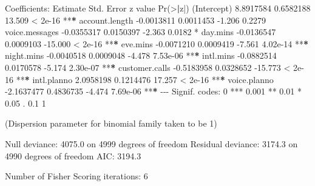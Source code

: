 \documentclass[
  11pt,
]{book}
\makeatletter
\newenvironment{Shaded}{}{}
\newcommand{\ControlFlowTok}[1]{\textcolor[rgb]{0.07,0.07,0.07}{#1}}
\newcommand{\DecValTok}[1]{#1}
\newcommand{\ErrorTok}[1]{\textcolor[rgb]{0.21,0.21,0.21}{\textbf{#1}}}
\newcommand{\FloatTok}[1]{#1}
\newcommand{\FunctionTok}[1]{#1}
\newcommand{\NormalTok}[1]{#1}
\newcommand{\SpecialCharTok}[1]{\textcolor[rgb]{0.39,0.39,0.39}{#1}}
\newcommand{\StringTok}[1]{\textcolor[rgb]{0.39,0.39,0.39}{#1}}
\newenvironment{kframe}{%
\medskip{}
\setlength{\fboxsep}{.8em}
 \def\at@end@of@kframe{}%
 \ifinner\ifhmode%
  \def\at@end@of@kframe{\end{minipage}}%
  \begin{minipage}{\columnwidth}%
 \fi\fi%
 \def\FrameCommand##1{\hskip\@totalleftmargin \hskip-\fboxsep
 \colorbox{shadecolor}{##1}\hskip-\fboxsep
     \hskip-\linewidth \hskip-\@totalleftmargin \hskip\columnwidth}%
 \MakeFramed {\advance\hsize-\width
   \@totalleftmargin\z@ \linewidth\hsize
   \@setminipage}}%
 {\par\unskip\endMakeFramed%
 \at@end@of@kframe}
\renewenvironment{Shaded}{\begin{kframe}}{\end{kframe}}
\theoremstyle{definition}
\theoremstyle{definition}
\theoremstyle{definition}
\theoremstyle{definition}
\theoremstyle{remark}
\makeatother
\begin{document}
\begin{Shaded}
\begin{Highlighting}[]
\NormalTok{   Coefficients}\SpecialCharTok{:}
\NormalTok{                    Estimate Std. Error z value }\FunctionTok{Pr}\NormalTok{(}\SpecialCharTok{\textgreater{}}\ErrorTok{|}\NormalTok{z}\SpecialCharTok{|}\NormalTok{)    }
\NormalTok{   (Intercept)     }\FloatTok{8.8917584}  \FloatTok{0.6582188}  \FloatTok{13.509}  \SpecialCharTok{\textless{}} \FloatTok{2e{-}16} \SpecialCharTok{**}\ErrorTok{*}
\NormalTok{   account.length }\SpecialCharTok{{-}}\FloatTok{0.0013811}  \FloatTok{0.0011453}  \SpecialCharTok{{-}}\FloatTok{1.206}   \FloatTok{0.2279}    
\NormalTok{   voice.messages }\SpecialCharTok{{-}}\FloatTok{0.0355317}  \FloatTok{0.0150397}  \SpecialCharTok{{-}}\FloatTok{2.363}   \FloatTok{0.0182} \SpecialCharTok{*}  
\NormalTok{   day.mins       }\SpecialCharTok{{-}}\FloatTok{0.0136547}  \FloatTok{0.0009103} \SpecialCharTok{{-}}\FloatTok{15.000}  \SpecialCharTok{\textless{}} \FloatTok{2e{-}16} \SpecialCharTok{**}\ErrorTok{*}
\NormalTok{   eve.mins       }\SpecialCharTok{{-}}\FloatTok{0.0071210}  \FloatTok{0.0009419}  \SpecialCharTok{{-}}\FloatTok{7.561} \FloatTok{4.02e{-}14} \SpecialCharTok{**}\ErrorTok{*}
\NormalTok{   night.mins     }\SpecialCharTok{{-}}\FloatTok{0.0040518}  \FloatTok{0.0009048}  \SpecialCharTok{{-}}\FloatTok{4.478} \FloatTok{7.53e{-}06} \SpecialCharTok{**}\ErrorTok{*}
\NormalTok{   intl.mins      }\SpecialCharTok{{-}}\FloatTok{0.0882514}  \FloatTok{0.0170578}  \SpecialCharTok{{-}}\FloatTok{5.174} \FloatTok{2.30e{-}07} \SpecialCharTok{**}\ErrorTok{*}
\NormalTok{   customer.calls }\SpecialCharTok{{-}}\FloatTok{0.5183958}  \FloatTok{0.0328652} \SpecialCharTok{{-}}\FloatTok{15.773}  \SpecialCharTok{\textless{}} \FloatTok{2e{-}16} \SpecialCharTok{**}\ErrorTok{*}
\NormalTok{   intl.planno     }\FloatTok{2.0958198}  \FloatTok{0.1214476}  \FloatTok{17.257}  \SpecialCharTok{\textless{}} \FloatTok{2e{-}16} \SpecialCharTok{**}\ErrorTok{*}
\NormalTok{   voice.planno   }\SpecialCharTok{{-}}\FloatTok{2.1637477}  \FloatTok{0.4836735}  \SpecialCharTok{{-}}\FloatTok{4.474} \FloatTok{7.69e{-}06} \SpecialCharTok{**}\ErrorTok{*}
   \SpecialCharTok{{-}{-}{-}}
\NormalTok{   Signif. codes}\SpecialCharTok{:}  \DecValTok{0} \StringTok{\textquotesingle{}***\textquotesingle{}} \FloatTok{0.001} \StringTok{\textquotesingle{}**\textquotesingle{}} \FloatTok{0.01} \StringTok{\textquotesingle{}*\textquotesingle{}} \FloatTok{0.05} \StringTok{\textquotesingle{}.\textquotesingle{}} \FloatTok{0.1} \StringTok{\textquotesingle{} \textquotesingle{}} \DecValTok{1}
   
\NormalTok{   (Dispersion parameter }\ControlFlowTok{for}\NormalTok{ binomial family taken to be }\DecValTok{1}\NormalTok{)}
   
\NormalTok{       Null deviance}\SpecialCharTok{:} \FloatTok{4075.0}\NormalTok{  on }\DecValTok{4999}\NormalTok{  degrees of freedom}
\NormalTok{   Residual deviance}\SpecialCharTok{:} \FloatTok{3174.3}\NormalTok{  on }\DecValTok{4990}\NormalTok{  degrees of freedom}
\NormalTok{   AIC}\SpecialCharTok{:} \FloatTok{3194.3}
   
\NormalTok{   Number of Fisher Scoring iterations}\SpecialCharTok{:} \DecValTok{6}
\end{Highlighting}
\end{Shaded}
\end{document}
